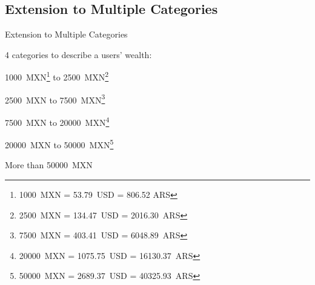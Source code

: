 \documentclass{beamer}
\begin{document}
\subsection{Extension to Multiple Categories}

\begin{frame}{Extension to Multiple Categories}

4 categories to describe a users' wealth:

\begin{description}[leftmargin=!]
	\item[\(R_1\)] \num{1000}~MXN\footnote{\num{1000}~MXN = \num{53.79}~USD = \num{806.52} ARS} to \num{2500}~MXN\footnote{\num{2500}~MXN = \num{134.47}~USD = \num{2016.30}~ARS}
	\item[\(R_2\)] \num{2500}~MXN to \num{7500}~MXN\footnote{\num{7500}~MXN = \num{403.41}~USD = \num{6048.89}~ARS}
	\item[\(R_3\)] \num{7500}~MXN to \num{20000}~MXN\footnote{\num{20000}~MXN = \num{1075.75}~USD = \num{16130.37}~ARS}
	\item[\(R_4\)] \num{20000}~MXN to \num{50000}~MXN\footnote{\num{50000}~MXN = \num{2689.37}~USD = \num{40325.93}~ARS}
	\item[\(R_5\)] More than \num{50000}~MXN
\end{description}

\end{frame}
\end{document}
